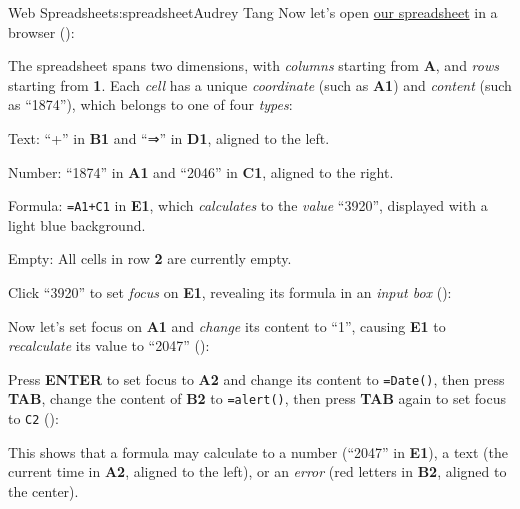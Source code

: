 \begin{aosachapter}{Web Spreadsheet}{s:spreadsheet}{Audrey Tang}
Now let's open \href{http://audreyt.github.io/500lines/spreadsheet/}{our
spreadsheet} in a browser ():


\label{basic-concepts}

The spreadsheet spans two dimensions, with \emph{columns} starting from
\textbf{A}, and \emph{rows} starting from \textbf{1}. Each \emph{cell}
has a unique \emph{coordinate} (such as \textbf{A1}) and \emph{content}
(such as ``1874''), which belongs to one of four \emph{types}:

\begin{aosaitemize}

\item
  Text: ``+'' in \textbf{B1} and ``⇒'' in \textbf{D1}, aligned to the
  left.
\item
  Number: ``1874'' in \textbf{A1} and ``2046'' in \textbf{C1}, aligned
  to the right.
\item
  Formula: \texttt{=A1+C1} in \textbf{E1}, which \emph{calculates} to
  the \emph{value} ``3920'', displayed with a light blue background.
\item
  Empty: All cells in row \textbf{2} are currently empty.
\end{aosaitemize}

Click ``3920'' to set \emph{focus} on \textbf{E1}, revealing its formula
in an \emph{input box} ():


Now let's set focus on \textbf{A1} and \emph{change} its content to
``1'', causing \textbf{E1} to \emph{recalculate} its value to ``2047''
():


Press \textbf{ENTER} to set focus to \textbf{A2} and change its content
to \texttt{=Date()}, then press \textbf{TAB}, change the content of
\textbf{B2} to \texttt{=alert()}, then press \textbf{TAB} again to set
focus to \texttt{C2} ():


This shows that a formula may calculate to a number (``2047'' in
\textbf{E1}), a text (the current time in \textbf{A2}, aligned to the
left), or an \emph{error} (red letters in \textbf{B2}, aligned to the
center).


\end{aosachapter}
